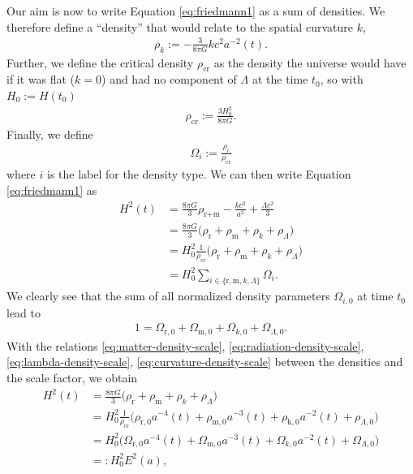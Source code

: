 \noindent Our aim is now to write Equation \eqref{eq:friedmann1} as a sum of densities. We therefore define a ``density'' that would relate to the spatial curvature $k$,
\begin{align}
    \rho_{k} := -\frac{3}{8 \pi G} kc^2 a^{-2}(t). \label{eq:curvature-density-scale}
\end{align}
Further, we define the critical density $\rho_{\text{cr}}$ as the density the universe would have if it was flat ($k=0$) and had no component of $\Lambda$ at the time $t_{0}$, so with $H_{0} := H(t_{0})$
\begin{align}
    \rho_{\text{cr}} := \frac{3 H_{0}^2}{8\pi G}. \label{eq:critical-density} 
\end{align}
Finally, we define 
\begin{align}
    \Omega_{i} := \frac{\rho_{i}}{\rho_{\text{cr}}} \label{eq:normalized-density}
\end{align}
where $i$ is the label for the density type. We can then write Equation \eqref{eq:friedmann1} as 
\begin{align}
    H^{2}(t) &= \frac{8\pi G}{3} \rho_{\text{r+m}} - \frac{kc^2}{a^2} + \frac{\Lambda c^2}{3} \nonumber \\
             &= \frac{8 \pi G}{3} \bigl( \rho_{\text{r}} + \rho_{\text{m}} + \rho_{k} + \rho_{\Lambda} \bigr) \nonumber \\     
             &= H_{0}^{2} \frac{1}{\rho_{\text{cr}}} \bigl( \rho_{\text{r}} + \rho_{\text{m}} + \rho_{k} + \rho_{\Lambda} \bigr) \nonumber \\
             &= H_{0}^{2} \sum_{i \in \{\text{r}, \text{m}, k, \Lambda \}} \Omega_{i}. \label{eq:hubble-square}
\end{align}
We clearly see that the sum of all normalized density parameters $\Omega_{i,0}$ at time $t_{0}$ lead to
\begin{align}
    1 = \Omega_{\text{r},0} + \Omega_{\text{m},0} + \Omega_{k,0} + \Omega_{\Lambda, 0}. \label{eq:density-parameters-sum} 
\end{align}
With the relations \eqref{eq:matter-density-scale}, \eqref{eq:radiation-density-scale}, \eqref{eq:lambda-density-scale}, \eqref{eq:curvature-density-scale} between the densities and the scale factor, we obtain
\begin{align*}
    H^{2}(t) &= \frac{8 \pi G}{3} \bigl(\rho_{\text{r}} + \rho_{\text{m}} + \rho_{k} + \rho_{\Lambda} \bigr) \\
             &= H_{0}^{2} \frac{1}{\rho_{\text{cr}}} \bigl(\rho_{\text{r},0} a^{-4}(t) + \rho_{\text{m},0} a^{-3}(t) + \rho_{\text{k},0} a^{-2}(t) + \rho_{\Lambda,0} \bigr) \\
             &= H_{0}^{2} \bigl(\Omega_{\text{r},0} a^{-4}(t) + \Omega_{\text{m},0} a^{-3}(t) + \Omega_{k,0} a^{-2}(t) + \Omega_{\Lambda,0} \bigr) \\
             &=: H_{0}^{2} E^{2}(a),
\end{align*}

